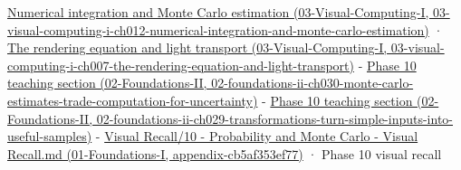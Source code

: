 \href{../03-Visual-Computing-I/main.pdf\#nameddest=03-visual-computing-i-ch012-numerical-integration-and-monte-carlo-estimation}{Numerical integration and Monte Carlo estimation (03-Visual-Computing-I, 03-visual-computing-i-ch012-numerical-integration-and-monte-carlo-estimation)} · \href{../03-Visual-Computing-I/main.pdf\#nameddest=03-visual-computing-i-ch007-the-rendering-equation-and-light-transport}{The rendering equation and light transport (03-Visual-Computing-I, 03-visual-computing-i-ch007-the-rendering-equation-and-light-transport)} - \href{../02-Foundations-II/main.pdf\#nameddest=02-foundations-ii-ch030-monte-carlo-estimates-trade-computation-for-uncertainty}{Phase 10 teaching section (02-Foundations-II, 02-foundations-ii-ch030-monte-carlo-estimates-trade-computation-for-uncertainty)} - \href{../02-Foundations-II/main.pdf\#nameddest=02-foundations-ii-ch029-transformations-turn-simple-inputs-into-useful-samples}{Phase 10 teaching section (02-Foundations-II, 02-foundations-ii-ch029-transformations-turn-simple-inputs-into-useful-samples)} - \href{../01-Foundations-I/main.pdf\#nameddest=appendix-cb5af353ef77}{Visual Recall/10 - Probability and Monte Carlo - Visual Recall.md (01-Foundations-I, appendix-cb5af353ef77)} · Phase 10 visual recall
